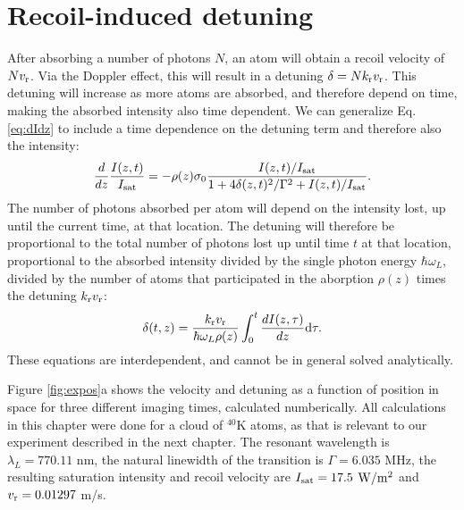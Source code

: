 \section{Recoil-induced detuning}

After absorbing a number of photons $N$, an atom will obtain a recoil velocity of $N v_{\rm{r}}$. Via the Doppler effect, this will result in a detuning $\delta=N k_{\rm{r}} v_{\rm{r}}$. This detuning will increase as more atoms are absorbed, and therefore depend on time, making the absorbed intensity also time dependent. We can generalize Eq. \ref{eq:dIdz} to include a time dependence on the detuning term and therefore also the intensity: 
\begin{equation}
\frac{d}{dz}\frac{I(z,t)}{I_{\rm{sat}}}=-\rho(z)\sigma_0\frac{I(z,t)/I_{\rm{sat}}}{1+4\delta(z,t)^2 /\Gamma^2+I(z,t)/I_{\rm{sat}}}. \label{eq3}
\end{equation}
The number of photons absorbed per atom will depend on the intensity lost, up until the current time, at that location. The detuning will therefore be proportional to the total number of photons lost up until time $t$ at that location, proportional to the absorbed intensity divided by the single photon energy $\hbar\omega_L$, divided by the number of atoms that participated in the aborption $\rho(z)$ times the detuning $ k_{\rm{r}} v_{\rm{r}}$:
\begin{equation}
\delta(t,z)=\frac{ k_{\rm{r}} v_{\rm{r}}}{\hbar\omega_L\rho(z)}\int_0^t\frac{dI(z,\tau)}{dz}\mathrm{d}\tau.
\label{eq4}
\end{equation}
These equations are interdependent, and cannot be in general solved analytically. 

Figure \ref{fig:expos}a shows the velocity and detuning as a function of position in space for three different imaging times, calculated numberically. All calculations in this chapter were done for a cloud of $^{40}\mathrm{K}$ atoms, as that is relevant to our experiment described in the next chapter. The resonant wavelength is $\lambda_L = 770.11$ nm, the natural linewidth of the transition is $\Gamma =  6.035$ MHz, the resulting saturation intensity and recoil velocity are $I_{\rm sat} = 17.5$ $ \rm{W/m^2}$ and $v_{\rm r}=0.01297$ m/s.  

